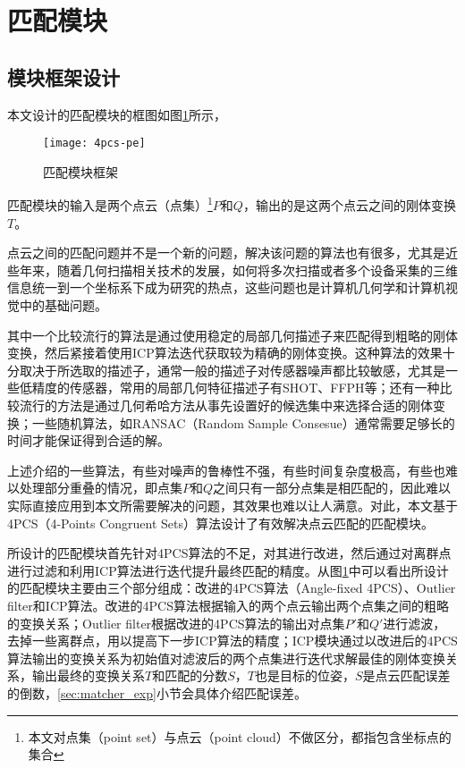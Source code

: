 \section{匹配模块}
\label{sec:matcher}

\subsection{模块框架设计}
本文设计的匹配模块的框图如图\ref{fig:4pcs-pe}所示，
\begin{figure}[ht]
  \centering
  \texttt{[image: 4pcs-pe]}
  \caption{匹配模块框架}
  \label{fig:4pcs-pe}
\end{figure}
匹配模块的输入是两个点云（点集）\footnote{本文对点集（point set）与点云（point cloud）不做区分，都指包含坐标点的集合}$P$和$Q$，输出的是这两个点云之间的刚体变换$T$。

点云之间的匹配问题并不是一个新的问题，解决该问题的算法也有很多，尤其是近些年来，随着几何扫描相关技术的发展，如何将多次扫描或者多个设备采集的三维信息统一到一个坐标系下成为研究的热点，这些问题也是计算机几何学和计算机视觉中的基础问题。

其中一个比较流行的算法是通过使用稳定的局部几何描述子来匹配得到粗略的刚体变换，然后紧接着使用ICP算法\cite{besl1992method}迭代获取较为精确的刚体变换\cite{li2005multiscale}。这种算法的效果十分取决于所选取的描述子，通常一般的描述子对传感器噪声都比较敏感，尤其是一些低精度的传感器，常用的局部几何特征描述子有SHOT\cite{salti2014shot}、FFPH\cite{rusu2009fast}等；还有一种比较流行的方法是通过几何希哈方法从事先设置好的候选集中来选择合适的刚体变换\cite{wolfson1997geometric}；一些随机算法，如RANSAC（Random Sample Consesue）\cite{bolles1981ransac}通常需要足够长的时间才能保证得到合适的解。

上述介绍的一些算法，有些对噪声的鲁棒性不强，有些时间复杂度极高，有些也难以处理部分重叠的情况，即点集$P$和$Q$之间只有一部分点集是相匹配的，因此难以实际直接应用到本文所需要解决的问题，其效果也难以让人满意。对此，本文基于4PCS（4-Points Congruent Sets）\cite{aiger20084}算法设计了有效解决点云匹配的匹配模块。

所设计的匹配模块首先针对4PCS算法的不足，对其进行改进，然后通过对离群点进行过滤和利用ICP算法进行迭代提升最终匹配的精度。从图\ref{fig:4pcs-pe}中可以看出所设计的匹配模块主要由三个部分组成：改进的4PCS算法（Angle-fixed 4PCS）、Outlier filter和ICP算法。改进的4PCS算法根据输入的两个点云输出两个点集之间的粗略的变换关系；Outlier filter根据改进的4PCS算法的输出对点集$P'$和$Q'$进行滤波，去掉一些离群点，用以提高下一步ICP算法的精度；ICP模块通过以改进后的4PCS算法输出的变换关系为初始值对滤波后的两个点集进行迭代求解最佳的刚体变换关系，输出最终的变换关系$T$和匹配的分数$S$，$T$也是目标的位姿，$S$是点云匹配误差的倒数，\ref{sec:matcher_exp}小节会具体介绍匹配误差。

